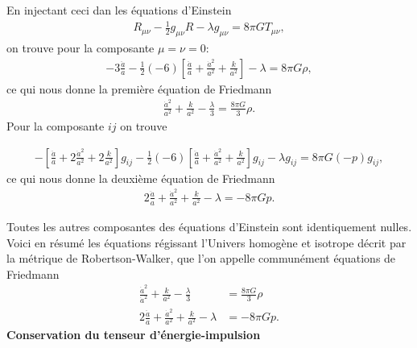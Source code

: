 \documentclass[a4paper,12pt]{report}
\theoremstyle{plain}
\theoremstyle{plain}
\begin{document}
  
  En injectant ceci dan les \'equations d'Einstein
  \begin{eqnarray}
  R_{\mu \nu} - \frac{1}{2} g_{\mu \nu }
   R- \lambda g_{\mu \nu } = 8 \pi G T_{\mu \nu }, 
   \end{eqnarray}
   on trouve pour la composante $\mu =\nu =0$: 
   \begin{eqnarray}
   -3 \frac{\ddot{a}}{a} -\frac{1}{2} (-6)
 \left[\frac{\ddot{a}}{a} + \frac{\dot{a}^2}{a^2} + \frac{k}{a^2} \right] - \lambda = 8 \pi G \rho,
 \end{eqnarray}
ce qui nous donne la premi\`ere \'equation de Friedmann
\begin{eqnarray}
\frac{\dot{a}^2}{a^2} + \frac{k}{a^2} - \frac{\lambda}{3} = \frac{8\pi G}{3} \rho .
\end{eqnarray}
Pour la composante $ij$ on trouve 

\begin{eqnarray}
- \left[ \frac{\ddot{a}}{a} +2 \frac{\dot{a}^2}{a^2} +2 \frac{k}{a^2} \right]  g_{ij}  - \frac{1}{2} (-6) \left[ \frac{\ddot{a}}{a} + \frac{\dot{a}^2}{a^2} + \frac{k}{a^2} \right] g_{ij} - \lambda g_{ij} =8 \pi G(-p) g_{ij} ,
\end{eqnarray}
ce qui nous donne la deuxi\`eme \'equation de Friedmann 
\begin{eqnarray} 
2 \frac{\ddot{a}}{a} + \frac{\dot{a}^2}{a^2} + \frac{k}{a^2}- \lambda = -8\pi Gp.
\end{eqnarray}
 
 Toutes  les autres composantes des \'equations d'Einstein sont identiquement nulles. Voici en r\'esum\'e les \'equations r\'egissant l'Univers homog\`ene et isotrope d\'ecrit par la m\'etrique de Robertson-Walker, que l'on appelle commun\'ement \'equations de Friedmann 
 \begin{eqnarray}
 \frac{\dot{a}^2}{\dot{a}^2} + \frac{k}{a^2} - \frac{\lambda }{3} & = \frac{8 \pi G }{3} \rho \\
 2 \frac{\ddot{a}}{a} + \frac{\dot{a}^2}{a^2} + \frac{k}{a^2} - \lambda &= -8 \pi G p.
 \end{eqnarray} 
\textbf{Conservation du tenseur d'\'energie-impulsion} 
\end{document}
